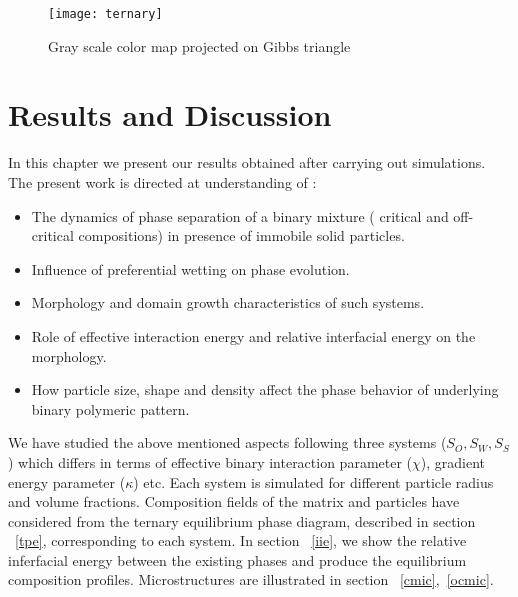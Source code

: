\documentclass[12pt]{iiscthes}
\theoremstyle{definition}
\theoremstyle{definition}
\theoremstyle{remark}
\begin{document}
\begin{figure}[h]
\begin{center}
\texttt{[image: ternary]}
\caption{Gray scale color map projected on Gibbs triangle}
\label{gs}
\end{center}
\end{figure}
\chapter{Results and Discussion}
In this chapter we present our results obtained after carrying out simulations. The present work is directed at understanding of : 
\begin{itemize}
\item The dynamics of phase separation of a binary mixture ( critical and off-critical compositions) in presence of immobile solid particles. 
\item Influence of preferential wetting on phase evolution.
\item Morphology and domain growth characteristics of such systems.
\item Role of effective interaction energy and relative interfacial energy on the morphology.
\item How particle size, shape and density affect the phase behavior of underlying binary polymeric pattern.
\end{itemize}
 
We have studied the above mentioned aspects following three systems ($S_O, S_W, S_S$) which differs in terms of effective binary interaction parameter ($\chi$), gradient energy parameter ($\kappa$) etc. Each system is simulated for different particle radius and volume fractions. Composition fields of the matrix and particles have considered from the ternary equilibrium phase diagram, described in section ~\ref{tpe}, corresponding to each system. In section ~\ref{iie}, we  show the relative inferfacial energy between the existing phases and produce the equilibrium composition profiles. Microstructures are illustrated in section ~\ref{cmic},~\ref{ocmic}.   
\end{document}
